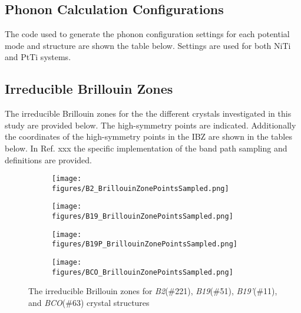\documentclass[preprint,colorlinks=true,linkcolor=black,citecolor=black]{elsarticle}
\begin{document}
\subsection{Phonon Calculation Configurations}
\label{sec:phonon_calc_config}

The code used to generate the phonon configuration settings for each
potential mode and structure are shown the table below. Settings are
used for both NiTi and PtTi systems.


\subsection{Irreducible Brillouin Zones}
\label{sec:appx_ibz}

The irreducible Brillouin zones for the the different crystals
investigated in this study are provided below. The high-symmetry
points are indicated. Additionally the coordinates of the
high-symmetry points in the IBZ are shown in the tables below. In
Ref. xxx the specific implementation of the band path sampling and
definitions are provided.


\begin{figure}[!htp]
  \centering
  \begin{subfigure}[b]{0.45\linewidth}
    \texttt{[image: figures/B2\_BrillouinZonePointsSampled.png]}
    \caption{}
    \label{fig:B2}
  \end{subfigure}
  \hfill
  \begin{subfigure}[b]{0.45\linewidth}
    \texttt{[image: figures/B19\_BrillouinZonePointsSampled.png]}
    \caption{}
    \label{fig:B19}
  \end{subfigure}
  \vspace{1mm}
  \begin{subfigure}[b]{0.45\linewidth}
    \texttt{[image: figures/B19P\_BrillouinZonePointsSampled.png]}
    \caption{}
    \label{fig:B19P}
  \end{subfigure}
  \hfill
  \begin{subfigure}[b]{0.45\linewidth}
    \texttt{[image: figures/BCO\_BrillouinZonePointsSampled.png]}
    \caption{}
    \label{fig:BCO}
  \end{subfigure}
  \caption{The irreducible Brillouin zones for \textit{B2}(\#221),
    \textit{B19}(\#51), \textit{B19'}(\#11), and \textit{BCO}(\#63)
    crystal structures}
  \label{fig:ibz}
\end{figure}

\pagebreak

\end{document}

